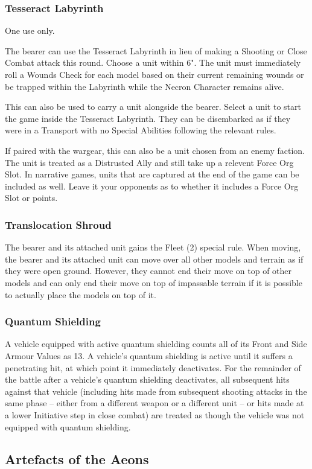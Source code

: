 \subsubsection{Tesseract Labyrinth} \label{Tesseract Labyrinth}

One use only.

The bearer can use the Tesseract Labyrinth in lieu of making a Shooting or Close Combat attack this round. Choose a unit within 6". The unit must immediately roll a Wounds Check for each model based on their current remaining wounds or be trapped within the Labyrinth while the Necron Character remains alive.

This can also be used to carry a unit alongside the bearer. Select a unit to start the game inside the Tesseract Labyrinth. They can be disembarked as if they were in a Transport with no Special Abilities following the relevant rules. 

If paired with the  wargear, this can also be a unit chosen from an enemy faction. The unit is treated as a Distrusted Ally and still take up a relevent Force Org Slot. In narrative games, units that are captured at the end of the game can be included as well. Leave it your opponents as to whether it includes a Force Org Slot or points.

\subsubsection{Translocation Shroud} \label{Translocation Shroud}

The bearer and its attached unit gains the Fleet (2) special rule. When moving, the bearer and its attached unit can move over all other models and terrain as if they were open ground. However, they cannot end their move on top of other models and can only end their move on top of impassable terrain if it is possible to actually place the models on top of it.

\subsubsection{Quantum Shielding} \label{Quantum Shielding}

A vehicle equipped with active quantum shielding counts all of its Front and Side Armour Values as 13. A vehicle’s quantum shielding is active until it suffers a penetrating hit, at which point it immediately
deactivates. For the remainder of the battle after a vehicle’s quantum shielding deactivates, all subsequent hits against that vehicle (including hits made from subsequent shooting attacks in the same phase – either
from a different weapon or a different unit – or hits made at a lower Initiative step in close combat) are treated as though the vehicle was not equipped with quantum shielding.

\subsection{Artefacts of the Aeons} \label{Artefacts of the Aeons}

